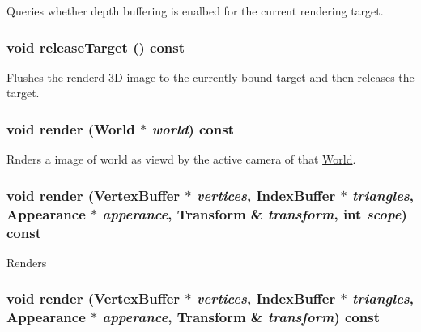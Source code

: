 Queries whether depth buffering is enalbed for the current rendering target. \hypertarget{classm3g_1_1Graphics3D_3ffaaf0d0f1e97a07c7f30c9b5a5dd32}{
\subsubsection[{releaseTarget}]{\setlength{\rightskip}{0pt plus 5cm}void releaseTarget () const}}
\label{classm3g_1_1Graphics3D_3ffaaf0d0f1e97a07c7f30c9b5a5dd32}


Flushes the renderd 3D image to the currently bound target and then releases the target. \hypertarget{classm3g_1_1Graphics3D_8ef004c92d601203b8c697d441e7713f}{
\subsubsection[{render}]{\setlength{\rightskip}{0pt plus 5cm}void render ({\bf World} $\ast$ {\em world}) const}}
\label{classm3g_1_1Graphics3D_8ef004c92d601203b8c697d441e7713f}


Rnders a image of world as viewd by the active camera of that \hyperlink{classm3g_1_1World}{World}. \hypertarget{classm3g_1_1Graphics3D_9179d0d886a57cd3234b34f1b59dfc3c}{
\subsubsection[{render}]{\setlength{\rightskip}{0pt plus 5cm}void render ({\bf VertexBuffer} $\ast$ {\em vertices}, \/  {\bf IndexBuffer} $\ast$ {\em triangles}, \/  {\bf Appearance} $\ast$ {\em apperance}, \/  {\bf Transform} \& {\em transform}, \/  int {\em scope}) const}}
\label{classm3g_1_1Graphics3D_9179d0d886a57cd3234b34f1b59dfc3c}


Renders \hypertarget{classm3g_1_1Graphics3D_dc32291b31d6d3a32037eb9f727f73c0}{
\subsubsection[{render}]{\setlength{\rightskip}{0pt plus 5cm}void render ({\bf VertexBuffer} $\ast$ {\em vertices}, \/  {\bf IndexBuffer} $\ast$ {\em triangles}, \/  {\bf Appearance} $\ast$ {\em apperance}, \/  {\bf Transform} \& {\em transform}) const}}
\label{classm3g_1_1Graphics3D_dc32291b31d6d3a32037eb9f727f73c0}



